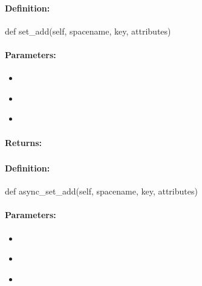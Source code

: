 \paragraph{Definition:}
\begin{pythoncode}
def set_add(self, spacename, key, attributes)
\end{pythoncode}

\paragraph{Parameters:}
\begin{itemize}[noitemsep]
\item {}\\

\item {}\\

\item {}\\

\end{itemize}

\paragraph{Returns:}


\pagebreak
\subsubsection{}
\label{api:python:async_set_add}


\paragraph{Definition:}
\begin{pythoncode}
def async_set_add(self, spacename, key, attributes)
\end{pythoncode}

\paragraph{Parameters:}
\begin{itemize}[noitemsep]
\item {}\\

\item {}\\

\item {}\\

\end{itemize}

